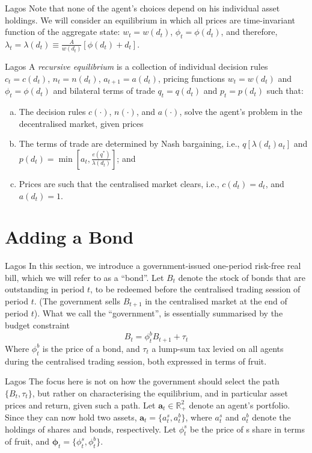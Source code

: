 \documentclass[aspectratio=169,xcolor=dvipsnames]{beamer}
\begin{document}
\begin{frame}{Lagos}
    Note that none of the agent's choices depend on his individual asset holdings. We will consider an equilibrium in which all prices are time-invariant function of the aggregate state: $w_t = w(d_t)$, $\phi_t = \phi(d_t)$, and therefore, $\lambda_t = \lambda(d_t) \equiv \frac{A}{w(d_t)}[\phi(d_t) + d_t]$.
\end{frame}

\begin{frame}{Lagos}
    A \emph{recursive equilibrium} is a collection of individual decision rules $c_t = c(d_t)$, $n_t = n(d_t)$, $a_{t+1} = a(d_t)$, pricing functions $w_t = w(d_t)$ and $\phi_t = \phi(d_t)$ and bilateral terms of trade $q_t = q(d_t)$ and $p_t = p(d_t)$ such that:
    \begin{enumerate}[(a)]
        \item The decision rules $c(\cdot)$, $n(\cdot)$, and $a(\cdot)$, solve the agent's problem in the decentralised market, given prices
        \item The terms of trade are determined by Nash bargaining, i.e., $q[\lambda(d_t) a_t]$ and $p(d_t) = \min\left[a_t, \frac{e(q^*)}{\lambda(d_t)}\right]$; and
        \item Prices are such that the centralised market clears, i.e., $c(d_t) = d_t$, and $a(d_t) = 1$.
    \end{enumerate}
\end{frame}

\section{Adding a Bond}

\begin{frame}{Lagos}
    In this section, we introduce a government-issued one-period risk-free real bill, which we will refer to as a ``bond''. Let $B_t$ denote the stock of bonds that are outstanding in period $t$, to be redeemed before the centralised trading session of period $t$. (The government sells $B_{t+1}$ in the centralised market at the end of period $t$). What we call the ``government'', is essentially summarised by the budget constraint
    \[
        B_t = \phi^b_t B_{t+1} + \tau_t
    \]
    Where $\phi^b_t$ is the price of a bond, and $\tau_t$ a lump-sum tax levied on all agents during the centralised trading session, both expressed in terms of fruit.
\end{frame}

\begin{frame}{Lagos}
    The focus here is not on how the government should select the path $\{B_t, \tau_t\}$, but rather on characterising the equilibrium, and in particular asset prices and return, given such a path. Let $\mathbf{a}_t \in \mathbb{R}^2_+$ denote an agent's portfolio. Since they can now hold two assets, $\mathbf{a}_t = \{a^s_t, a^b_t\}$, where $a^s_t$ and $a^b_t$ denote the holdings of shares and bonds, respectively. Let $\phi^s_t$ be the price of s share in terms of fruit, and $\boldsymbol{\phi}_t = \{\phi^s_t, \phi^b_t\}$.
\end{frame}
\end{document}
